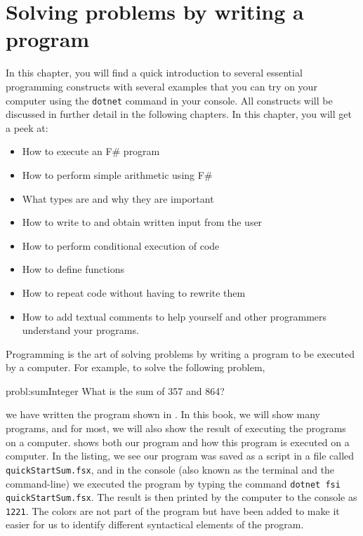 \documentclass[springer.tex]{subfiles}
\begin{document}
\chapter{Solving problems by writing a program}
\label{chap:quickStartGuide}

\begin{objectives}
  In this chapter, you will find a quick introduction to several essential programming constructs with several examples that you can try on your computer using the \lstinline[language=console]{dotnet} command in your console. All constructs will be discussed in further detail in the following chapters. In this chapter, you will get a peek at:
  \begin{itemize}
  \item How to execute an F\# program
  \item How to perform simple arithmetic using F\#
  \item What types are and why they are important
  \item How to write to and obtain written input from the user
  \item How to perform conditional execution of code
  \item How to define functions
  \item How to repeat code without having to rewrite them
  \item How to add textual comments to help yourself and other programmers understand your programs.
  \end{itemize}
\end{objectives}

Programming is the art of solving problems by writing a program to be executed by a computer. For example, to solve the following problem,
%
\begin{task}{probl:sumInteger}
  What is the sum of 357 and 864?
\end{task}
%
we have written the program shown in .
%
%
In this book, we will show many programs, and for most, we will also show the result of executing the programs on a computer.  shows both our program and how this program is executed on a computer. In the listing, we see our program was saved as a script in a file called \lstinline[language=console]{quickStartSum.fsx}, and in the console (also known as the terminal and the command-line) we executed the program by typing the command \lstinline[language=console]|dotnet fsi quickStartSum.fsx|. The result is then printed by the computer to the console as \lstinline{1221}. The colors are not part of the program but have been added to make it easier for us to identify different syntactical elements of the program.
\end{document}
